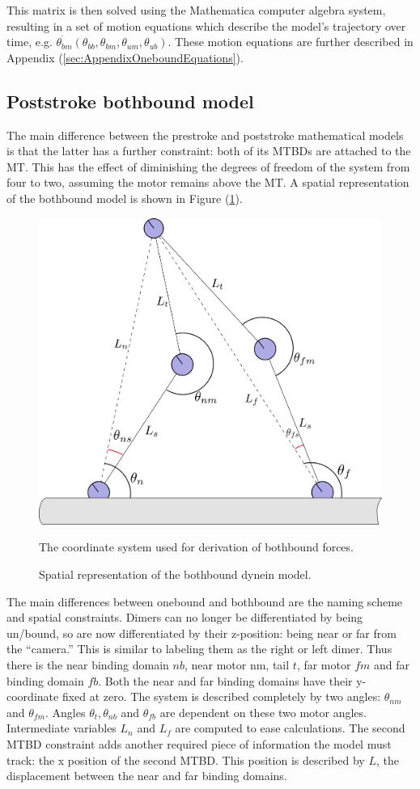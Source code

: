 \documentclass[
11pt, %
english, %
singlespacing, %
headsepline, %
chapterinoneline, %
]{MastersDoctoralThesis} %
\begin{document}
This matrix is then solved using the Mathematica computer algebra system, resulting in a set of motion equations which describe the model's trajectory over time, e.g. $\dot{\theta_{bm}}(\theta_{bb}, \theta_{bm}, \theta_{um}, \theta_{ub})$. These motion equations are further described in Appendix (\ref{sec:AppendixOneboundEquations}).\\

\subsection{Poststroke bothbound model}
The main difference between the prestroke and poststroke mathematical models is that the latter has a further constraint: both of its MTBDs are attached to the MT. This has the effect of diminishing the degrees of freedom of the system from four to two, assuming the motor remains above the MT. A spatial representation of the bothbound model is shown in Figure (\ref{fig:derivation-bothbound}).\\

\begin{figure}[h]
  \centering
  \includegraphics[width=.45\textwidth]{../figures/derivation-bothbound}
  \caption{Spatial representation of the bothbound dynein model.}{The coordinate system used for derivation of bothbound forces.}
  \label{fig:derivation-bothbound}
\end{figure}

The main differences between onebound and bothbound are the naming scheme and spatial constraints. Dimers can no longer be differentiated by being un/bound, so are now differentiated by their z-position: being near or far from the ``camera.'' This is similar to labeling them as the right or left dimer. Thus there is the near binding domain $nb$, near motor $\text{nm}$, tail $t$, far motor $fm$ and far binding domain $fb$. Both the near and far binding domains have their y-coordinate fixed at zero. The system is described completely by two angles: $\theta_{nm}$ and $\theta_{fm}$. Angles $\theta_t, \theta_{nb}$ and $\theta_{fb}$ are dependent on these two motor angles. Intermediate variables $L_{n}$ and $L_{f}$ are computed to ease calculations. The second MTBD constraint adds another required piece of information the model must track: the x position of the second MTBD. This position is described by $L$, the displacement between the near and far binding domains.\\
\end{document}
